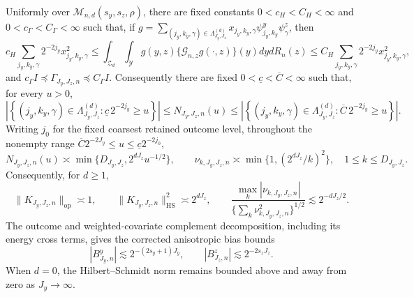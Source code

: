 Uniformly over \(\mathcal M_{n,d}(s_y,s_z,\rho)\), there are fixed constants \(0<c_H<C_H<\infty\) and \(0<c_\Gamma<C_\Gamma<\infty\) such that, if \(g=\sum_{(j_y,k_y,\gamma)\in\Lambda_{J_y,J_z}^{(d)}}x_{j_y,k_y,\gamma}\psi^y_{j_y,k_y}\psi^z_\gamma\), then
\[
c_H\sum_{j_y,k_y,\gamma}2^{-2j_y}x_{j_y,k_y,\gamma}^2
\le\int_{\mathcal Z_d}\int_{\mathcal Y}g(y,z)\{\mathcal G_{n,z}g(\cdot,z)\}(y)dydR_n(z)
\le C_H\sum_{j_y,k_y,\gamma}2^{-2j_y}x_{j_y,k_y,\gamma}^2,
\]
and \(c_\Gamma I\preceq\Gamma_{J_y,J_z,n}\preceq C_\Gamma I\). Consequently there are fixed \(0<\underline c<\overline C<\infty\) such that, for every \(u>0\),
\[
\left|\left\{(j_y,k_y,\gamma)\in\Lambda_{J_y,J_z}^{(d)}:\underline c\,2^{-2j_y}\ge u\right\}\right|
\le N_{J_y,J_z,n}(u)
\le
\left|\left\{(j_y,k_y,\gamma)\in\Lambda_{J_y,J_z}^{(d)}:\overline C\,2^{-2j_y}\ge u\right\}\right|.
\]
Writing \(j_0\) for the fixed coarsest retained outcome level, throughout the nonempty range \(\overline C2^{-2J_y}\le u\le\underline c2^{-2j_0}\),
\[
N_{J_y,J_z,n}(u)\asymp\min\{D_{J_y,J_z},2^{dJ_z}u^{-1/2}\},
\qquad
\nu_{k,J_y,J_z,n}\asymp\min\{1,(2^{dJ_z}/k)^2\},\quad 1\le k\le D_{J_y,J_z}.
\]
Consequently, for \(d\ge1\),
\[
\|K_{J_y,J_z,n}\|_{\mathrm{op}}\asymp1,
\qquad \|K_{J_y,J_z,n}\|_{\mathrm{HS}}^2\asymp2^{dJ_z},
\qquad
\frac{\max_k|\nu_{k,J_y,J_z,n}|}{\{\sum_k\nu_{k,J_y,J_z,n}^2\}^{1/2}}
\lesssim2^{-dJ_z/2}.
\]
The outcome and weighted-covariate complement decomposition, including its energy cross terms, gives the corrected anisotropic bias bounds
\[
|B^y_{J_y,n}|\lesssim2^{-(2s_y+1)J_y},
\qquad
|B^z_{J_z,n}|\lesssim2^{-2s_zJ_z}.
\]
When \(d=0\), the Hilbert--Schmidt norm remains bounded above and away from zero as \(J_y\to\infty\).
